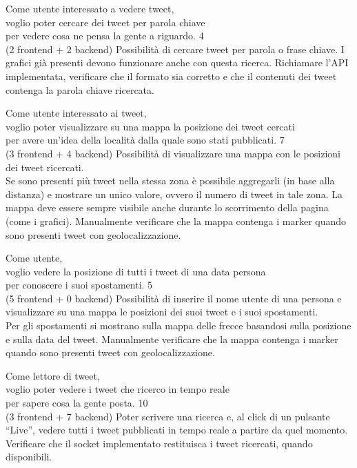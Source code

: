 \userstory%
{Come utente interessato a vedere tweet,\\voglio poter cercare dei tweet per parola chiave\\per vedere cosa ne pensa la gente a riguardo.}%
{4\\(2 frontend + 2 backend)}%
{Possibilità di cercare tweet per parola o frase chiave. I grafici già presenti devono funzionare anche con questa ricerca.}%
{Richiamare l'API implementata, verificare che il formato sia corretto e che il contenuti dei tweet contenga la parola chiave ricercata.}

\userstory%
{Come utente interessato ai tweet,\\voglio poter visualizzare su una mappa la posizione dei tweet cercati\\per avere un'idea della località dalla quale sono stati pubblicati.}%
{7\\(3 frontend + 4 backend)}%
{Possibilità di visualizzare una mappa con le posizioni dei tweet ricercati.\\
Se sono presenti più tweet nella stessa zona è possibile aggregarli (in base alla distanza) e mostrare un unico valore, 
ovvero il numero di tweet in tale zona. La mappa deve essere sempre visibile anche durante lo scorrimento della pagina (come i grafici).}%
{Manualmente verificare che la mappa contenga i marker quando sono presenti tweet con geolocalizzazione.}

\userstory%
{Come utente,\\voglio vedere la posizione di tutti i tweet di una data persona\\per conoscere i suoi spostamenti.}%
{5\\(5 frontend + 0 backend)}%
{Possibilità di inserire il nome utente di una persona e visualizzare su una mappa le posizioni dei suoi tweet e i suoi spostamenti.\\
Per gli spostamenti si mostrano sulla mappa delle frecce basandosi sulla posizione e sulla data del tweet.}%
{Manualmente verificare che la mappa contenga i marker quando sono presenti tweet con geolocalizzazione.}

\userstory%
{Come lettore di tweet,\\voglio poter vedere i tweet che ricerco in tempo reale\\per sapere cosa la gente posta.}%
{10\\(3 frontend + 7 backend)}%
{Poter scrivere una ricerca e, al click di un pulsante “Live”, vedere tutti i tweet pubblicati in tempo reale a partire da quel momento.}%
{Verificare che il socket implementato restituisca i tweet ricercati, quando disponibili.}

